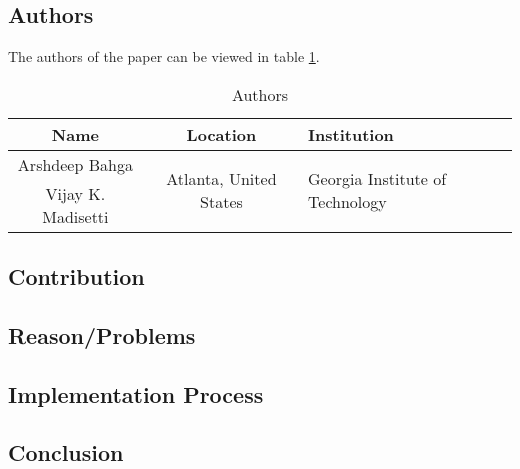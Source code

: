 \clearpage
\section*{\citet{2016_Bahga}}

\subsection*{Authors}
The authors of the paper can be viewed in table \ref{tab:2016_Bahga_Authors}.
\begin{longtable}{ |c|c|p{5cm}| }
	\caption{Authors} \label{tab:2016_Bahga_Authors} \\
	\hline
 	\cellcolor{Gray}Name & \cellcolor{Gray}Location & \cellcolor{Gray}Institution \\ [0.5ex] 
 	\hline\hline
 	\endhead
 	Arshdeep Bahga & \multirow{2}{*}{\parbox{5cm}{\centering Atlanta, United States}}  & \multirow{2}{*}{\parbox{5cm}{\centering Georgia Institute of Technology}}  \\
	\cline{1-1}
	 Vijay K. Madisetti &   &  \\
	 \hline
\end{longtable}


\subsection*{Contribution}



\subsection*{Reason/Problems}



\subsection*{Implementation Process}


\subsection*{Conclusion}

